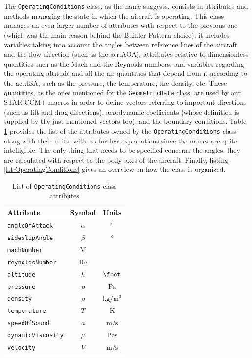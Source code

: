 The \lstinline[language=Java]!OperatingConditions! class, as the name suggests, consists in attributes and methods managing the state in which the aircraft is operating. This class manages an even larger number of attributes with respect to the previous one (which was the main reason behind the Builder Pattern choice): it includes variables taking into account the angles between reference lines of the aircraft and the flow direction (such as the \gls{acr:AOA}), attributes relative to dimensionless quantities such as the Mach and the Reynolds numbers, and variables regarding the operating altitude and all the air quantities that depend from it according to the \gls{acr:ISA}, such as the pressure, the temperature, the density, etc. These quantities, as the ones mentioned for the \lstinline[language=Java]!GeometricData! class, are used by our STAR-CCM+ macros in order to define vectors referring to important directions (such as lift and drag directions), aerodynamic coefficients (whose definition is supplied by the just mentioned vectors too), and the boundary conditions. Table \ref{tab:OperatingConditions} provides the list of the attributes owned by the \lstinline[language=Java]!OperatingConditions! class along with their units, with no further explanations since the names are quite intelligible. The only thing that needs to be specified concerns the angles: they are calculated with respect to the body axes of the aircraft. Finally, listing \ref{lst:OperatingConditions} gives an overview on how the class is organized.
%
\bigskip
\begin{table}[H]
\centering
\begin{tabular}{lcc}
\toprule
\textbf{Attribute} & \textbf{Symbol} & \textbf{Units}\\
\midrule
\lstinline[language=Java]!angleOfAttack! & $\alpha$ & $\si{\degree}$ \\
\lstinline[language=Java]!sideslipAngle! & $\beta$ & $\si{\degree}$ \\
\lstinline[language=Java]!machNumber! & $\text{M}$ & \\
\lstinline[language=Java]!reynoldsNumber! & $\text{Re}$ & \\
\lstinline[language=Java]!altitude! & $h$ & $\si{\foot}$ \\
\lstinline[language=Java]!pressure! & $p$ & $\si{\pascal}$ \\
\lstinline[language=Java]!density! & $\rho$ & $\si{\kilogram\per\meter\tothe{3}}$\\
\lstinline[language=Java]!temperature! & $T$ & $\si{\kelvin}$ \\
\lstinline[language=Java]!speedOfSound! & $a$ & $\si{\meter\per\second}$ \\
\lstinline[language=Java]!dynamicViscosity! & $\mu$ & $\si{\pascal\second}$\\
\lstinline[language=Java]!velocity! & $V$ & $\si{\meter\per\second}$ \\
\bottomrule
\end{tabular}
\caption{List of \lstinline[language=Java]!OperatingConditions! class attributes}
\label{tab:OperatingConditions}
\end{table}
